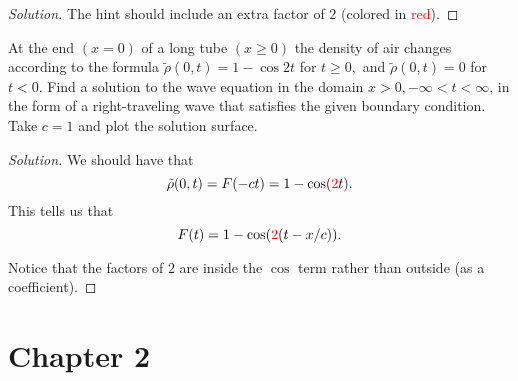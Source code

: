 \documentclass[11pt]{article}
\newenvironment{solution}
  {\renewcommand\qedsymbol{$\blacksquare$}\begin{proof}[Solution]}
  {\end{proof}}
\begin{document}
\begin{solution}
The hint should include an extra factor of $2$ (colored in \textcolor{red}{red}).
\end{solution}

\begin{exercise}{8}
  At the end $(x = 0)$ of a long tube $(x \geq 0)$ the density of air changes according to the formula $\tilde{\rho}(0,t) = 1 - \cos 2t$ for $t \geq 0,$ 
  and $\tilde{\rho}(0,t) = 0$ for $t < 0$. Find a solution to the wave equation in the domain $x>0, -\infty<t< \infty$, in the form of a 
  right-traveling wave that satisfies the given boundary condition. Take $c = 1$ and plot the solution surface.
\end{exercise}

\begin{solution}
We should have that \[\tilde{\rho}(0,t) = F(-ct) = 1- \cos(\textcolor{red}{2}t).\] This tells us that \[F(t) = 1-\cos(\textcolor{red}{2}(t - x/c)). \]

Notice that the factors of $2$ are inside the $\cos$ term rather than outside (as a coefficient).
\end{solution}

\section{Chapter 2}
\end{document}

